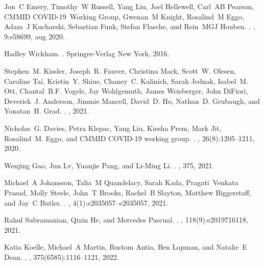 \documentclass[12pt]{article}
\begin{document}
\begin{thebibliography}{10}
Jon~C Emery, Timothy~W Russell, Yang Liu, Joel Hellewell, Carl~AB Pearson,
  CMMID COVID-19~Working Group, Gwenan~M Knight, Rosalind~M Eggo, Adam~J
  Kucharski, Sebastian Funk, Stefan Flasche, and Rein~MGJ Houben.
.
, 9:e58699, aug 2020.

Hadley Wickham.
.
\newblock Springer-Verlag New York, 2016.

Stephen~M. Kissler, Joseph~R. Fauver, Christina Mack, Scott~W. Olesen, Caroline
  Tai, Kristin~Y. Shiue, Chaney~C. Kalinich, Sarah Jednak, Isabel~M. Ott,
  Chantal~B.F. Vogels, Jay Wohlgemuth, James Weisberger, John DiFiori,
  Deverick~J. Anderson, Jimmie Mancell, David~D. Ho, Nathan~D. Grubaugh, and
  Yonatan~H. Grad.
.
, 2021.

Nicholas~G. Davies, Petra Klepac, Yang Liu, Kiesha Prem, Mark Jit, Rosalind~M.
  Eggo, and {CMMID COVID-19 working group}.
.
, 26(8):1205--1211, 2020.

Wenjing Gao, Jun Lv, Yuanjie Pang, and Li-Ming Li.
.
, 375, 2021.

Michael~A Johansson, Talia~M Quandelacy, Sarah Kada, Pragati~Venkata Prasad,
  Molly Steele, John~T Brooks, Rachel~B Slayton, Matthew Biggerstaff, and Jay~C
  Butler.
.
, 4(1):e2035057--e2035057, 2021.

Rahul Subramanian, Qixin He, and Mercedes Pascual.
.
,
  118(9):e2019716118, 2021.

Katia Koelle, Michael~A Martin, Rustom Antia, Ben Lopman, and Natalie~E Dean.
.
, 375(6585):1116--1121, 2022.


\end{thebibliography}
\end{document}
